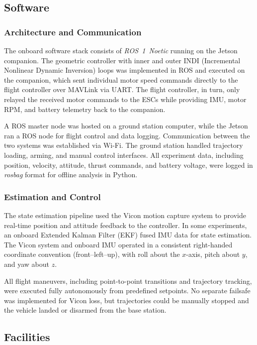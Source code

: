 \subsection{Software}

\subsubsection{Architecture and Communication}
The onboard software stack consists of \textit{ROS~1~Noetic} running on the Jetson companion. The geometric controller with inner and outer INDI (Incremental Nonlinear Dynamic Inversion) loops was implemented in ROS and executed on the companion, which sent individual motor speed commands directly to the flight controller over MAVLink via UART. The flight controller, in turn, only relayed the received motor commands to the ESCs while providing IMU, motor RPM, and battery telemetry back to the companion.

A ROS master node was hosted on a ground station computer, while the Jetson ran a ROS node for flight control and data logging. Communication between the two systems was established via Wi-Fi. The ground station handled trajectory loading, arming, and manual control interfaces. All experiment data, including position, velocity, attitude, thrust commands, and battery voltage, were logged in \textit{rosbag} format for offline analysis in Python.

\subsubsection{Estimation and Control}
The state estimation pipeline used the Vicon motion capture system to provide real-time position and attitude feedback to the controller. In some experiments, an onboard Extended Kalman Filter (EKF) fused IMU data for state estimation. The Vicon system and onboard IMU operated in a consistent right-handed coordinate convention (front–left–up), with roll about the $x$-axis, pitch about $y$, and yaw about $z$.

All flight maneuvers, including point-to-point transitions and trajectory tracking, were executed fully autonomously from predefined setpoints. No separate failsafe was implemented for Vicon loss, but trajectories could be manually stopped and the vehicle landed or disarmed from the base station.

\subsection{Facilities}

